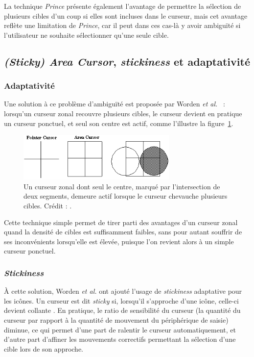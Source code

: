 	La technique \emph{Prince} présente également l'avantage de permettre la sélection de plusieurs cibles d'un coup si elles sont incluses dans le curseur, mais cet avantage reflète une limitation de \emph{Prince}, car il peut dans ces cas-là y avoir ambiguïté si l'utilisateur ne souhaite sélectionner qu'une seule cible.
	
	\subsection{\emph{(Sticky) Area Cursor}, \emph{stickiness} et adaptativité}
		\subsubsection{Adaptativité}
	Une solution à ce problème d'ambiguïté est proposée par Worden \emph{et al.}~\cite{worden1997making} : lorsqu'un curseur zonal recouvre plusieurs cibles, le curseur devient en pratique un curseur ponctuel, et seul son centre est actif, comme l'illustre la figure~\ref{fig:areaCursor}.
	
	\begin{figure}[!htb]
		\centering
		\includegraphics[width=0.70\textwidth]{figures/ch2/areaCursor}
		\caption[\emph{Area Cursor} avec \emph{hot spot}]{Un curseur zonal dont seul le centre, marqué par l'intersection de deux segments, demeure actif lorsque le curseur chevauche plusieurs cibles. Crédit : \cite{worden1997making}.}
		\label{fig:areaCursor}
	\end{figure}
	
	Cette technique simple permet de tirer parti des avantages d'un curseur zonal quand la densité de cibles est suffisamment faibles, sans pour autant souffrir de ses inconvénients lorsqu'elle est élevée, puisque l'on revient alors à un simple curseur ponctuel.
	
		\subsubsection{\emph{Stickiness}}
	À cette solution, Worden \emph{et al.} ont ajouté l'usage de \emph{stickiness} adaptative pour les icônes. Un curseur est dit \emph{sticky} si, lorsqu'il s'approche d'une icône, celle-ci devient \og collante \fg{}. En pratique, le ratio de sensibilité du curseur (la quantité du curseur par rapport à la quantité de mouvement du périphérique de saisie) diminue, ce qui permet d'une part de ralentir le curseur automatiquement, et d'autre part d'affiner les mouvements correctifs permettant la sélection d'une cible lors de son approche.
	
